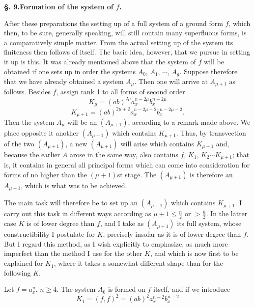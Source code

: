 \documentclass[10pt]{article}
\begin{document}
\begin{center}
{\bfseries §. 9.\quad Formation of the system of $f$.}
\end{center}

After these preparations the setting up of a full system of a ground form $f$, which then, to be sure, generally speaking, will still contain many superfluous forms, is a comparatively simple matter. From the actual setting up of the system its finiteness then follows of itself. The basic idea, however, that we pursue in setting it up is this. It was already mentioned above that the system of $f$ will be obtained if one sets up in order the systems $A_0$, $A_1$, $\cdots$, $A_g$. Suppose therefore that we have already obtained a system $A_\mu$. Then one will arrive at $A_{\mu+1}$ as follows. Besides $f$, assign rank 1 to all forms of second order
\[
K_\mu=(ab)^{2\mu}a_x^{n-2\mu}b_x^{n-2\mu}
\]
\[
K_{\mu+1}=(ab)^{2\mu+2}a_x^{n-2\mu-2}b_x^{n-2\mu-2}.
\]
Then the system $A_\mu$ will be an $(A_{\mu+1})$, according to a remark made above. We place opposite it another $(A_{\mu+1})$ which contains $K_{\mu+1}$. Thus, by transvection of the two $(A_{\mu+1})$, a new $(A_{\mu+1})$ will arise which contains $K_{\mu+1}$ and, because the earlier $A$ arose in the same way, also contains $f$, $K_1$, $K_2\cdots K_{\mu+1}$; that is, it contains in general all principal forms which can come into consideration for forms of no higher than the $(\mu+1)$st stage. The $(A_{\mu+1})$ is therefore an $A_{\mu+1}$, which is what was to be achieved.

The main task will therefore be to set up an $(A_{\mu+1})$ which contains $K_{\mu+1}$. I carry out this task in different ways according as $\mu+1\leq\frac n2$ or $>\frac n2$. In the latter case $K$ is of lower degree than $f$, and I take as $(A_{\mu+1})$ its full system, whose constructibility I postulate for $K$, precisely insofar as it is of lower degree than $f$. But I regard this method, as I wish explicitly to emphasize, as much more imperfect than the method I use for the other $K$, and which is now first to be explained for $K_1$, where it takes a somewhat different shape than for the following $K$.

Let $f=a_x^n$, $n\geq4$. The system $A_0$ is formed on $f$ itself, and if we introduce
\[
K_1=(f,f)^2=(ab)^2a_x^{n-2}b_x^{n-2}
\]


\end{document}
